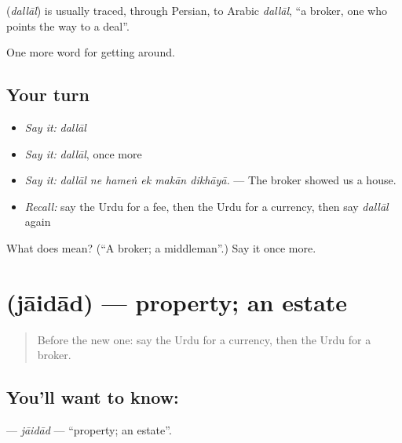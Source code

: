 \begin{cousinweb}
\textbf{} (\emph{dallāl}) is usually traced, through Persian, to Arabic \emph{dallāl}, \textquotedblleft{}a broker, one who points the way to a deal\textquotedblright{}.
\end{cousinweb}

\begin{grammarlens}[title={What you've built}]
One more word for getting around.
\end{grammarlens}

\subsection*{Your turn}
\begin{itemize}
\raggedright
  \item \emph{Say it:} \emph{dallāl}
  \item \emph{Say it:} \emph{dallāl}, once more
  \item \emph{Say it:} \emph{dallāl ne hameṅ ek makān dikhāyā.} — The broker showed us a house.
  \item \emph{Recall:} say the Urdu for a fee, then the Urdu for a currency, then say \emph{dallāl} again
\end{itemize}

\begin{tcolorbox}[breakable,colback=teal!4,colframe=teal!35!black,title={Before you move on}]
What does  mean? (\textquotedblleft{}A broker; a middleman\textquotedblright{}.) Say it once more.
\end{tcolorbox}
\section[\texorpdfstring{\ur{جائیداد} (jāidād)}{جائیداد (jāidād)}]{ (jāidād) — property; an estate}

\label{lesson:UR-C422-jaidad}



\begin{quote}
Before the new one: say the Urdu for a currency, then the Urdu for a broker.
\end{quote}

\subsection*{You'll want to know: }
\textbf{} — \emph{jāidād} — \textquotedblleft{}property; an estate\textquotedblright{}.

